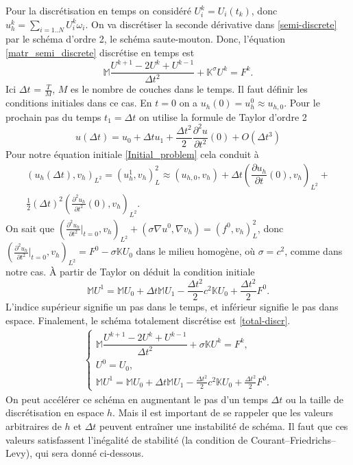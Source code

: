 \documentclass[12pt]{article}
\newcommand{\pd}[2]{ %
	\dfrac{\partial #1}{\partial #2}
}
\begin{document}
Pour la discrétisation en temps on considéré $U_i^k = U_i(t_k)$, donc\\ $u_h^k = \sum_{i = 1..N}U_i^k\omega_i$. On va discrétiser la seconde dérivative dans \eqref{semi-discrete} par le schéma d'ordre 2, le schéma saute-mouton. Donc, l'équation \eqref{matr_semi_discrete} discrétise en temps est
\begin{equation}
\mathbb{M}\dfrac{U^{k+1} - 2U^k + U^{k - 1}}{\Delta t^2} + \mathbb{K}^\sigma U^k = F^k.
\end{equation}
Ici $\Delta t $ = $\frac{T}{M}$, $M$ es le nombre de couches dans le temps.
Il faut définir les conditions initiales dans ce cas. En $t = 0$ on a $u_h(0) = u_h^0 \approx u_{h,0}$. Pour le prochain pas du temps $t_1 = \Delta t$ on utilise la formule de Taylor d’ordre 2
\begin{equation}
u(\Delta t) = u_0 + \Delta t u_1 + \frac{\Delta t^2}{2}\frac{\partial^2u}{\partial t^2}(0) + O(\Delta t^3)
\end{equation}
Pour notre équation initiale \eqref{Initial_problem} cela conduit à 
\begin{multline}
\label{Teylor}
	(u_h(\Delta t), v_h)_{L^2} = (u_h^1, v_h)_L^2 \approx (u_{h,0}, v_h) + \Delta t(\pd{u_h}{t}(0),v_h)_{L^2} +\\ \frac{1}{2}(\Delta t)^2(\frac{\partial^2 u_h}{\partial t^2}(0), v_h)_{L^2}.
\end{multline}
On sait que $(\frac{\partial^2 u_h}{\partial t^2}|_{t = 0}, v_h)_{L^2}  + (\sigma \nabla u^0,\nabla v_h) = (f^0,v_h)_L^2$, donc \\
$(\frac{\partial^2 u_h}{\partial t^2}|_{t = 0}, v_h)_{L^2} = F^0 - \sigma\mathbb{K} U_0$ dans le milieu homogène, où $\sigma = c^2$, comme dans notre cas.
À partir de Taylor on déduit la condition initiale
\begin{equation}
	\mathbb{M}U^1 = \mathbb{M}U_0 + \Delta t\mathbb{M}U_1 - \frac{\Delta t^2}{2}c^2\mathbb{K}U_0 +  \frac{\Delta t^2}{2}F^0.
\end{equation}
L'indice supérieur signifie un pas dans le temps, et inférieur signifie le pas dans espace. Finalement, le schéma totalement discrétise est \eqref{total-discr}.
\begin{eqnarray}
\label{total-discr}
\begin{cases}
\mathbb{M}\dfrac{U^{k+1} - 2U^k + U^{k - 1}}{\Delta t^2} +\sigma \mathbb{K} U^k = F^k,\\
U^0 = U_0,\\
\mathbb{M}U^1 = \mathbb{M}U_0 + \Delta t\mathbb{M}U_1 - \frac{\Delta t^2}{2}c^2\mathbb{K}U_0 +  \frac{\Delta t^2}{2}F^0.
\end{cases}
\end{eqnarray}
On peut accélérer ce schéma en augmentant le pas d'un temps $\Delta t$ ou la taille de discrétisation en espace $h$. Mais il est important de se rappeler que les valeurs arbitraires de $h$ et $\Delta t$ peuvent entraîner une instabilité de schéma. Il faut que ces valeurs satisfassent l'inégalité de stabilité (la condition de Courant–Friedrichs–Levy), qui sera donné ci-dessous.
\end{document}
